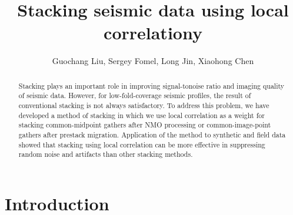 \title{Stacking seismic data using local correlationy}

\renewcommand{\thefootnote}{\fnsymbol{footnote}}


\address{
\footnotemark[1] State Key Laboratory of Petroleum Resources and Prospecting\\
China University of Petroleum\\
Beijing, China \\
\footnotemark[2] Bureau of Economic Geology,\\
John A. and Katherine G. Jackson School of Geosciences \\
The University of Texas at Austin \\
University Station, Box X \\
Austin, TX, USA, 78713-8924 \\
\footnotemark[3] Institute for Geophysics,\\
John A. and Katherine G. Jackson School of Geosciences \\
The University of Texas at Austin \\
Austin, TX, USA, 78713-8924
}

\author{Guochang Liu\footnotemark[1]\footnotemark[2], Sergey Fomel\footnotemark[2], Long Jin\footnotemark[3], Xiaohong Chen\footnotemark[1]}

\maketitle

\begin{abstract}

Stacking plays an important role in improving signal-tonoise ratio and imaging 
quality of seismic data. However, for low-fold-coverage seismic profiles, the 
result of conventional stacking is not always satisfactory. To address this 
problem, we have developed a method of stacking in which we use local 
correlation as a weight for stacking common-midpoint gathers after NMO 
processing or common-image-point gathers after prestack migration. Application 
of the method to synthetic and field data showed that stacking using local
correlation can be more effective in suppressing random noise and artifacts 
than other stacking methods.

\end{abstract}

\section{Introduction}


